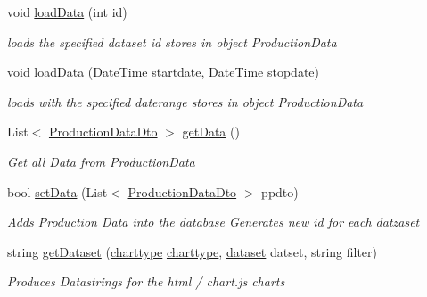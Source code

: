\begin{DoxyCompactItemize}
void \hyperlink{classkpi_mvc_api_1_1_data_transfer_objects_1_1_production_data_dto_rs_a7d16375d7b096dca36d98942a6e0f80f}{load\+Data} (int id)
\begin{DoxyCompactList}\small\item\em loads the specified dataset id stores in object {\ttfamily Production\+Data} \end{DoxyCompactList}\item 
void \hyperlink{classkpi_mvc_api_1_1_data_transfer_objects_1_1_production_data_dto_rs_a375b888daefaacc620cffef48ac7ab81}{load\+Data} (Date\+Time startdate, Date\+Time stopdate)
\begin{DoxyCompactList}\small\item\em loads with the specified daterange stores in object {\ttfamily  Production\+Data } \end{DoxyCompactList}\item 
List$<$ \hyperlink{classkpi_mvc_api_1_1_data_transfer_objects_1_1_production_data_dto}{Production\+Data\+Dto} $>$ \hyperlink{classkpi_mvc_api_1_1_data_transfer_objects_1_1_production_data_dto_rs_abd52b81c37bd026514f480e3d6dd952b}{get\+Data} ()
\begin{DoxyCompactList}\small\item\em Get all Data from {\ttfamily Production\+Data} \end{DoxyCompactList}\item 
bool \hyperlink{classkpi_mvc_api_1_1_data_transfer_objects_1_1_production_data_dto_rs_a403a889d4d7b6dbc5ddd07e85c660892}{set\+Data} (List$<$ \hyperlink{classkpi_mvc_api_1_1_data_transfer_objects_1_1_production_data_dto}{Production\+Data\+Dto} $>$ ppdto)
\begin{DoxyCompactList}\small\item\em Adds Production Data into the database Generates new id for each datzaset \end{DoxyCompactList}\item 
string \hyperlink{classkpi_mvc_api_1_1_data_transfer_objects_1_1_production_data_dto_rs_adc1e1fa71f2425f2eff2ac5a563f4d7c}{get\+Dataset} (\hyperlink{classkpi_mvc_api_1_1_data_transfer_objects_1_1_production_data_dto_rs_a45716f0cdee396710530b9562be56f9a}{charttype} \hyperlink{classkpi_mvc_api_1_1_data_transfer_objects_1_1_production_data_dto_rs_a45716f0cdee396710530b9562be56f9a}{charttype}, \hyperlink{classkpi_mvc_api_1_1_data_transfer_objects_1_1_production_data_dto_rs_ab356c7600182705746e7b61967dd63df}{dataset} datset, string filter)
\begin{DoxyCompactList}\small\item\em Produces Datastrings for the html / chart.\+js charts \end{DoxyCompactList}\item 

\end{DoxyCompactItemize}
